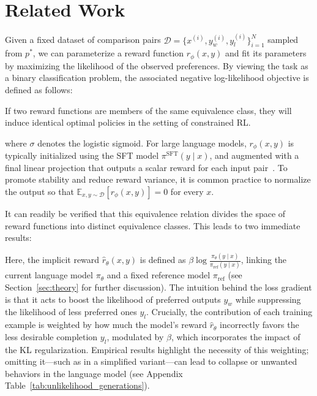 \section{Related Work}

Given a fixed dataset of comparison pairs $\mathcal{D}=\bigl\{x^{(i)}, y_w^{(i)}, y_l^{(i)}\bigr\}_{i=1}^N$ sampled from $p^*$, we can parameterize a reward function $r_{\phi}(x, y)$ and fit its parameters by maximizing the likelihood of the observed preferences. By viewing the task as a binary classification problem, the associated negative log-likelihood objective is defined as follows:

\begin{lemma}\label{lemma:same_policy}
    If two reward functions are members of the same equivalence class, they will induce identical optimal policies in the setting of constrained RL.
\end{lemma}

where $\sigma$ denotes the logistic sigmoid. For large language models, $r_{\phi}(x, y)$ is typically initialized using the SFT model $\pi^\text{SFT}(y \mid x)$, and augmented with a final linear projection that outputs a scalar reward for each input pair~\cite{ziegler2020finetuning}. To promote stability and reduce reward variance, it is common practice to normalize the output so that $\mathbb{E}_{x,y\sim \mathcal{D}}\left[r_\phi(x, y)\right] = 0$ for every $x$.

It can readily be verified that this equivalence relation divides the space of reward functions into distinct equivalence classes. This leads to two immediate results:

Here, the implicit reward $\hat{r}_\theta(x, y)$ is defined as $\beta \log \frac{\pi_\theta(y \mid x)}{\pi_\text{ref}(y \mid x)}$, linking the current language model $\pi_\theta$ and a fixed reference model $\pi_\text{ref}$ (see Section~\ref{sec:theory} for further discussion). The intuition behind the loss gradient is that it acts to boost the likelihood of preferred outputs $y_w$ while suppressing the likelihood of less preferred ones $y_l$. Crucially, the contribution of each training example is weighted by how much the model’s reward $\hat{r}_\theta$ incorrectly favors the less desirable completion $y_l$, modulated by $\beta$, which incorporates the impact of the KL regularization. Empirical results highlight the necessity of this weighting; omitting it—such as in a simplified variant—can lead to collapse or unwanted behaviors in the language model (see Appendix Table~\ref{tab:unlikelihood_generations}).

